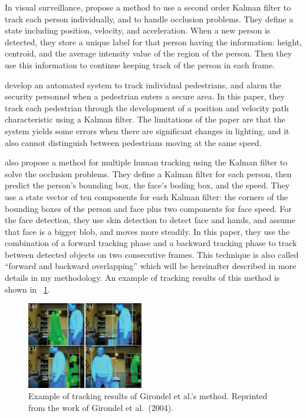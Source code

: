 In visual surveillance,  propose a method to
use a second order Kalman filter to track each person individually,
and to handle occlusion problems. They define a state including
position, velocity, and acceleration. When a new person is detected,
they store a unique label for that person having the information:
height, centroid, and the average intensity value of the region of the
person. Then they use this information to continue keeping track of
the person in each frame.

 develop an automated system to track
individual pedestrians, and alarm the security personnel when a
pedestrian enters a secure area. In this paper, they track each
pedestrian through the development of a position and velocity path
characteristic using a Kalman filter. The limitations of the paper are
that the system yields some errors when there are significant changes
in lighting, and it also cannot distinguish between pedestrians moving
at the same speed.

 also propose a method for multiple
human tracking using the Kalman filter to solve the occlusion
problems. They define a Kalman filter for each person, then predict
the person's bounding box, the face's boding box, and the speed. They
use a state vector of ten components for each Kalman filter: the
corners of the bounding boxes of the person and face plus two
components for face speed. For the face detection, they use skin
detection to detect face and hands, and assume that face is a bigger
blob, and moves more steadily. In this paper, they use the combination
of a forward tracking phase and a backward tracking phase to track
between detected objects on two consecutive frames. This technique is
also called ``forward and backward overlapping'' which will be
hereinafter described in more details in my methodology. An example of
tracking results of this method is shown
in \figurename~\ref{fig:girondel-tracking-result}.

\begin{figure}[t]
  \centering
  \includegraphics[width=2in]{figures/girondel-tracking-result.png}
  \caption[Example of tracking results of Girondel et al.'s
  method]{Example of tracking results of Girondel et al.'s
  method. Reprinted from the work of Girondel et al.\ (2004).}
  \label{fig:girondel-tracking-result}
\end{figure}

